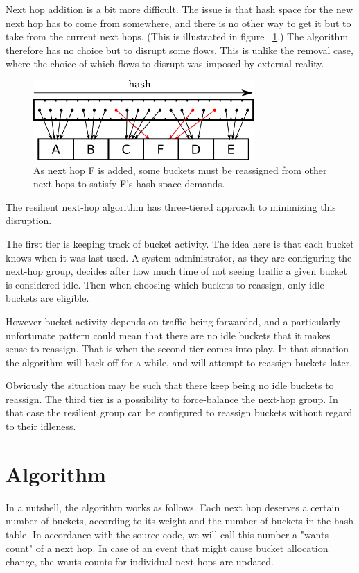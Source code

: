 \documentclass[letterpaper]{article}
\begin{document}
Next hop addition is a bit more difficult. The issue is that hash space for
the new next hop has to come from somewhere, and there is no other way to
get it but to take from the current next hops. (This is illustrated in
figure ~\ref{fig:reshash-addition}.) The algorithm therefore has no choice
but to disrupt some flows. This is unlike the removal case, where the
choice of which flows to disrupt was imposed by external reality.

\begin{figure}[H]
\includegraphics[width=3.31in]{reshash-addition.png}
\caption{As next hop F is added, some buckets must be reassigned from other
  next hops to satisfy F's hash space demands.}
\label{fig:reshash-addition}
\end{figure}

The resilient next-hop algorithm has three-tiered approach to minimizing
this disruption.

The first tier is keeping track of bucket activity. The idea here is that
each bucket knows when it was last used. A system administrator, as they
are configuring the next-hop group, decides after how much time of not
seeing traffic a given bucket is considered idle. Then when choosing which
buckets to reassign, only idle buckets are eligible.

However bucket activity depends on traffic being forwarded, and a
particularly unfortunate pattern could mean that there are no idle buckets
that it makes sense to reassign. That is when the second tier comes into
play. In that situation the algorithm will back off for a while, and will
attempt to reassign buckets later.

Obviously the situation may be such that there keep being no idle buckets
to reassign. The third tier is a possibility to force-balance the next-hop
group. In that case the resilient group can be configured to reassign
buckets without regard to their idleness.

\section{Algorithm}

In a nutshell, the algorithm works as follows. Each next hop deserves a
certain number of buckets, according to its weight and the number of
buckets in the hash table. In accordance with the source code, we will call
this number a "wants count" of a next hop. In case of an event that might
cause bucket allocation change, the wants counts for individual next hops
are updated.
\end{document}

